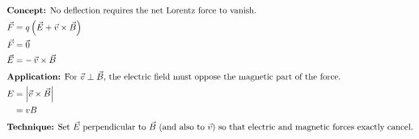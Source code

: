 \begin{enumerate}[leftmargin=*]
\begin{idea}
    \begin{align*}
    \intertext{\textbf{Concept:} No deflection requires the net Lorentz force to vanish.}
    \vec{F} &= q\left(\vec{E}+\vec{v}\times\vec{B}\right) \\
    \vec{F} &= \vec{0} \\
    \vec{E} &= -\,\vec{v}\times\vec{B} \\
    \intertext{\textbf{Application:} For $\vec{v}\perp\vec{B}$, the electric field must oppose the magnetic part of the force.}
    E &= \left|\vec{v}\times\vec{B}\right| \\
    &= vB \\
    \intertext{\textbf{Technique:} Set $\vec{E}$ perpendicular to $\vec{B}$ (and also to $\vec{v}$) so that electric and magnetic forces exactly cancel.}
    \end{align*}
\end{idea}
\end{enumerate}

